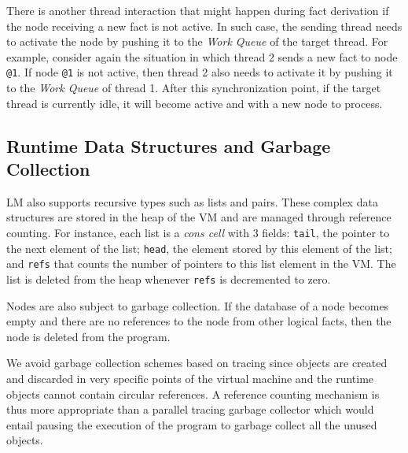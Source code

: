 There is another thread interaction that might happen during fact derivation if
the node receiving a new fact is not active. In such case, the sending thread
needs to activate the node by pushing it to the \emph{Work Queue} of the target
thread. For example, consider again the situation in which thread 2 sends a new
fact to node \texttt{@1}. If node \texttt{@1} is not active, then thread 2 also
needs to activate it by pushing it to the \emph{Work Queue} of thread 1. After
this synchronization point, if the target thread is currently idle, it will
become active and with a new node to process.

\subsection{Runtime Data Structures and Garbage Collection}

LM also supports recursive types such as lists and pairs. These complex data
structures are stored in the heap of the VM and are managed through reference
counting. For instance, each list is a \emph{cons cell} with 3 fields:
\texttt{tail}, the pointer to the next element of the list; \texttt{head}, the
element stored by this element of the list; and \texttt{refs} that counts the
number of pointers to this list element in the VM. The list is deleted from the
heap whenever \texttt{refs} is decremented to zero.

Nodes are also subject to garbage collection. If the database of a node becomes
empty and there are no references to the node from other logical facts, then
the node is deleted from the program.

We avoid garbage collection schemes based on tracing since objects are created
and discarded in very specific points of the virtual machine and the runtime
objects cannot contain circular references. A reference counting mechanism is
thus more appropriate than a parallel tracing garbage collector which would
entail pausing the execution of the program to garbage collect all the unused
objects.
